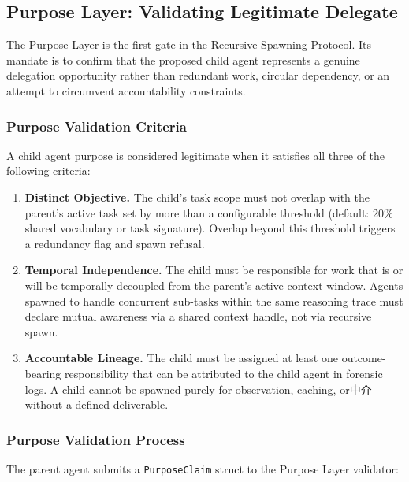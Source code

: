 \subsection{Purpose Layer: Validating Legitimate Delegate}
\label{subsection:purpose-layer}

The Purpose Layer is the first gate in the Recursive Spawning Protocol. Its mandate is to confirm that the proposed child agent represents a genuine delegation opportunity rather than redundant work, circular dependency, or an attempt to circumvent accountability constraints.

\subsubsection{Purpose Validation Criteria}
\label{subsubsection:purpose-validation-criteria}

A child agent purpose is considered legitimate when it satisfies all three of the following criteria:

\begin{enumerate}
    \item \textbf{Distinct Objective.} The child's task scope must not overlap with the parent's active task set by more than a configurable threshold (default: 20\% shared vocabulary or task signature). Overlap beyond this threshold triggers a redundancy flag and spawn refusal.
    \item \textbf{Temporal Independence.} The child must be responsible for work that is or will be temporally decoupled from the parent's active context window. Agents spawned to handle concurrent sub-tasks within the same reasoning trace must declare mutual awareness via a shared context handle, not via recursive spawn.
    \item \textbf{Accountable Lineage.} The child must be assigned at least one outcome-bearing responsibility that can be attributed to the child agent in forensic logs. A child cannot be spawned purely for observation, caching, or中介 without a defined deliverable.
\end{enumerate}

\subsubsection{Purpose Validation Process}
\label{subsubsection:purpose-validation-process}

The parent agent submits a \texttt{PurposeClaim} struct to the Purpose Layer validator:

